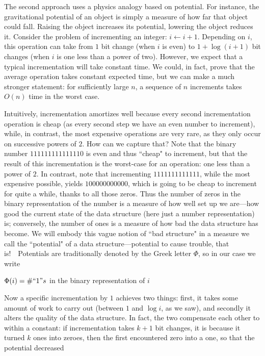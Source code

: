 \documentclass[11pt]{article}
\begin{document}
The second approach uses a physics analogy based on potential.  For instance,
the gravitational potential of an object is simply a measure of how far
that object could fall.  Raising the object increases its potential,
lowering the object reduces it.
Consider the problem of incrementing an integer: $i\leftarrow i+1$.
Depending on $i$, this operation can take from $1$ bit change (when
$i$ is even) to $1+\log (i+1)$ bit changes (when $i$ is one less than a
power of two).  However, we expect that a typical incrementation will
take constant time.  We could, in fact, prove that the average operation
takes constant expected time, but we can make a much stronger statement:
for sufficiently large $n$, a sequence of $n$ increments takes $O(n)$ time
in the worst case.

Intuitively, incrementation amortizes well because every second incrementation
operation is cheap (as every second step we have an even number to increment),
while, in contrast, the most expensive operations are very rare, as they only
occur on successive powers of $2$.  How can we capture that?
Note that the binary number $111111111111110$ is even and thus ``cheap"
to increment, but that the result of this incrementation is the worst-case
for an operation: one less than a power of $2$.  In contrast, note that
incrementing $1111111111111$, while the most expensive possible, yields
$100000000000$, which is going to be cheap to increment for quite a while,
thanks to all those zeros.  Thus the number of zeros in the binary
representation of the number is a measure of how well set up we are---how
good the current state of the data structure (here just a number
representation) is; conversely, the number of ones is a measure of how bad
the data structure has become.  We will embody this vague notion of
``bad structure" in a measure we call the ``potential" of a data
structure---potential to cause trouble, that is!\ \ Potentials are
traditionally denoted by the Greek letter $\Phi$, so in our case we write
\begin{center}
  $\Phi(i) = \# ``1"s$ in the binary representation of $i$
\end{center}
Now a specific incrementation by $1$ achieves two things: first, it
takes some amount of work to carry out (between $1$ and $\log i$, as
we saw), and secondly it alters the quality of the data structure.
In fact, the two compensate each other to within a constant: if incrementation
takes $k+1$ bit changes, it is because it turned $k$ ones into zeroes,
then the first encountered zero into a one, so that the potential decreased
\end{document}
